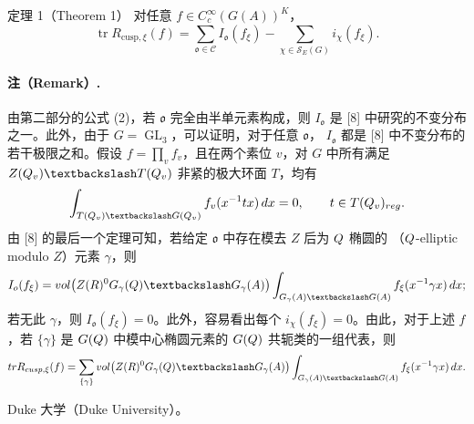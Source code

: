 \begin{originaltheorem}{定理 1（Theorem 1）}
对任意 $f\in C_c^\infty(G(A))^K$，
\[
 \operatorname{tr}R_{\mathrm{cusp},\xi}(f)
 =\sum_{\mathfrak o\in\mathcal C}I_\mathfrak o(f_\xi)
 -\sum_{\chi\in\mathcal S_E(G)}i_\chi(f_\xi).
\]
\end{originaltheorem}

\paragraph*{注（Remark）.}
由第二部分的公式 (2)，若 $\mathfrak o$ 完全由半单元素构成，则 $I_\mathfrak o$ 是 [8] 中研究的不变分布之一。此外，由于 $G=\operatorname{GL}_3$，可以证明，对于任意 $\mathfrak o$，
$I_\mathfrak o$ 都是 [8] 中不变分布的若干极限之和。假设 $f=\prod_vf_v$，且在两个素位 $v$，对 $G$ 中所有满足
$Z(\Q_v)\backslash T(\Q_v)$ 非紧的极大环面 $T$，均有
\[
 \int_{T(\Q_v)\backslash G(\Q_v)}f_v(x^{-1}tx)\,dx=0,
 \qquad t\in T(\Q_v)_{\mathrm{reg}}.
\]
由 [8] 的最后一个定理可知，若给定 $\mathfrak o$ 中存在模去 $Z$ 后为 $Q$ 椭圆的
（$Q$-elliptic modulo $Z$）元素 $\gamma$，则
\[
 I_\mathfrak o(f_\xi)=\operatorname{vol}\bigl(Z(\R)^0G_\gamma(\Q)\backslash G_\gamma(A)\bigr)
 \int_{G_\gamma(A)\backslash G(A)}f_\xi(x^{-1}\gamma x)\,dx;
\]
若无此 $\gamma$，则 $I_\mathfrak o(f_\xi)=0$。此外，容易看出每个 $i_\chi(f_\xi)=0$。由此，对于上述 $f$，若 $\{\gamma\}$ 是 $G(Q)$ 中模中心椭圆元素的
$G(Q)$ 共轭类的一组代表，则
\[
 \operatorname{tr}R_{\mathrm{cusp},\xi}(f)
 =\sum_{\{\gamma\}}\operatorname{vol}\bigl(Z(\R)^0G_\gamma(\Q)\backslash G_\gamma(A)\bigr)
 \int_{G_\gamma(A)\backslash G(A)}f_\xi(x^{-1}\gamma x)\,dx.
\]

\noindent Duke 大学（Duke University）。

